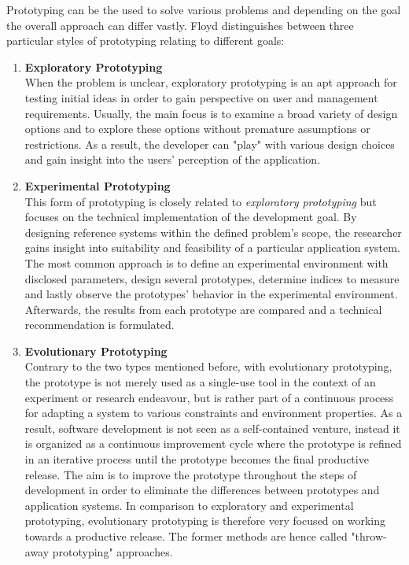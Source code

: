     Prototyping can be the used to solve various problems and depending on the goal the overall approach can differ vastly. Floyd\autocite{Floyd1984APrototyping} distinguishes between three particular styles of prototyping relating to different goals:
    
    \begin{enumerate}
        \item \textbf{Exploratory Prototyping}\\
            When the problem is unclear, exploratory prototyping is an apt approach for testing initial ideas in order to gain perspective on user and management requirements. Usually, the main focus is to examine a broad variety of design options and to explore these options without premature assumptions or restrictions. As a result, the developer can "play" with various design choices and gain insight into the users' perception of the application. 
        \item \textbf{Experimental Prototyping}\\
            This form of prototyping is closely related to \textit{exploratory prototyping} but focuses on the technical implementation of the development goal. By designing reference systems within the defined problem's scope, the researcher gains insight into suitability and feasibility of a particular application system. The most common approach is to define an experimental environment with disclosed parameters, design several prototypes, determine indices to measure and lastly observe the prototypes' behavior in the experimental environment. Afterwards, the results from each prototype are compared and a technical recommendation is formulated. 
        \item \textbf{Evolutionary Prototyping}\\
            Contrary to the two types mentioned before, with evolutionary prototyping, the prototype is not merely used as a single-use tool in the context of an experiment or research endeavour, but is rather part of a continuous process for adapting a system to various constraints and environment properties. As a result, software development is not seen as a self-contained venture, instead it is organized as a continuous improvement cycle where the prototype is refined in an iterative process until the prototype becomes the final productive release. The aim is to improve the prototype throughout the steps of development in order to eliminate the differences between prototypes and application systems. In comparison to exploratory and experimental prototyping, evolutionary prototyping is therefore very focused on working towards a productive release. The former methods are hence called "throw-away prototyping" approaches.
    \end{enumerate}
    
